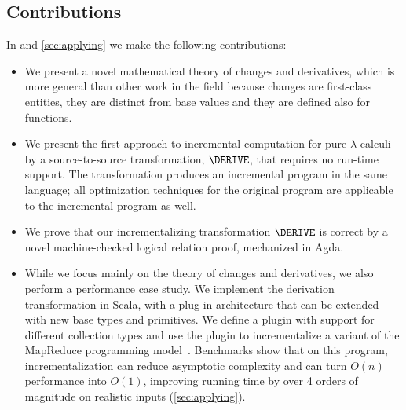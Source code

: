 \subsection{Contributions}
In  and \cref{sec:applying} we make the following contributions:
\begin{itemize}
\item We present a novel mathematical theory of changes and derivatives, which
  is more general than other work in the field because changes are first-class
  entities, they are distinct from base values and they are defined also for
  functions.
%
\item We present the first approach to incremental computation for pure
  $\lambda$-calculi by a source-to-source transformation, $\DERIVE$, that
  requires no run-time support. The transformation produces an incremental
  program in the same language; all optimization techniques for the original
  program are applicable to the incremental program as well.


%
\item We prove that our incrementalizing transformation $\DERIVE$
is correct by a novel machine-checked logical relation
proof, mechanized in Agda.

\item While we focus mainly on the theory of changes
and derivatives, we also perform a performance case study.
We implement the derivation transformation in Scala,
with a plug-in architecture that can be extended with new base
types and primitives. We define a plugin with support for
different collection types and use the plugin to
incrementalize a variant of the MapReduce programming model~\citep{Lammel07}.
  Benchmarks show that on this program,
  incrementalization can reduce asymptotic complexity and can turn $O(n)$
  performance into $O(1)$, improving running time by over 4
  orders of magnitude on realistic inputs (\cref{sec:applying}).
\end{itemize}

